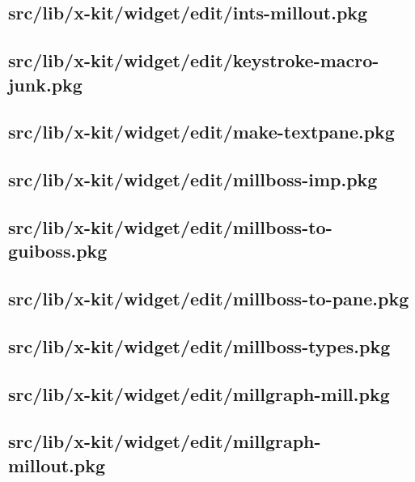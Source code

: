 \subsection{src/lib/x-kit/widget/edit/ints-millout.pkg}


\subsection{src/lib/x-kit/widget/edit/keystroke-macro-junk.pkg}


\subsection{src/lib/x-kit/widget/edit/make-textpane.pkg}


\subsection{src/lib/x-kit/widget/edit/millboss-imp.pkg}


\subsection{src/lib/x-kit/widget/edit/millboss-to-guiboss.pkg}


\subsection{src/lib/x-kit/widget/edit/millboss-to-pane.pkg}


\subsection{src/lib/x-kit/widget/edit/millboss-types.pkg}


\subsection{src/lib/x-kit/widget/edit/millgraph-mill.pkg}


\subsection{src/lib/x-kit/widget/edit/millgraph-millout.pkg}


